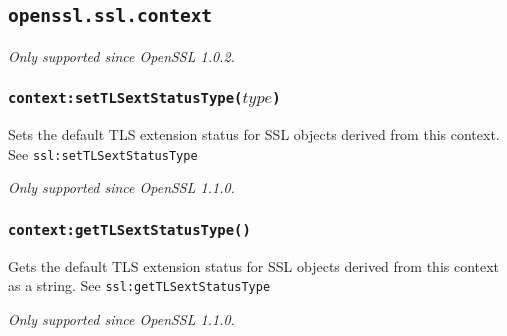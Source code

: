 \documentclass[11pt, oneside]{memoir}
\newcommand*{\fn}[1]{\texttt{#1}\xspace}
\newcounter{toccols}
\newenvironment{Module}[1]{
	\subsection{\texttt{#1}}
	\addtocontents{toc}{
		\protect\begin{multicols}{\value{toccols}}
	}
}{
	\addtocontents{toc}{\protect\end{multicols}}
}
\begin{document}
\begin{Module}{openssl.ssl.context}
\emph{Only supported since OpenSSL 1.0.2.}

\subsubsection[\fn{context:setTLSextStatusType}]{\fn{context:setTLSextStatusType($type$)}}

Sets the default TLS extension status for SSL objects derived from this context.
See \fn{ssl:setTLSextStatusType}

\emph{Only supported since OpenSSL 1.1.0.}

\subsubsection[\fn{context:getTLSextStatusType}]{\fn{context:getTLSextStatusType()}}

Gets the default TLS extension status for SSL objects derived from this context as a string.
See \fn{ssl:getTLSextStatusType}

\emph{Only supported since OpenSSL 1.1.0.}

\end{Module}
\end{document}
